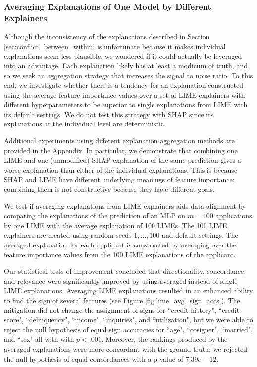 \documentclass[mnsc,blindrev]{informs3}
\begin{document}
            \subsubsection{Averaging Explanations of One Model by Different Explainers}
            \label{sec:averaging_one_explainer}
            Although the inconsistency of the explanations described in Section \ref{sec:conflict_between_within} is unfortunate because it makes individual explanations seem less plausible, we wondered if it could actually be leveraged into an advantage. Each explanation likely has at least a modicum of truth, and so we seek an aggregation strategy that increases the signal to noise ratio. To this end, we investigate whether there is a tendency for an explanation constructed using the average feature importance values over a set of LIME explainers with different hyperparameters to be superior to single explanations from LIME with its default settings. We do not test this strategy with SHAP since its explanations at the individual level are deterministic. 
            
            Additional experiments using different explanation aggregation methods are provided in the Appendix. In particular, we demonstrate that combining one LIME and one (unmodified) SHAP explanation of the same prediction gives a worse explanation than either of the individual explanations. This is because SHAP and LIME have different underlying meanings of feature importance; combining them is not constructive because they have different goals. 
        
            We test if averaging explanations from LIME explainers aids data-alignment by comparing the explanations of the prediction of an MLP on $m=100$ applications by one LIME with the average explanation of 100 LIMEs. The 100 LIME explainers are created using random seeds $1,\ldots,100$ and default settings. The averaged explanation for each applicant is constructed by averaging over the feature importance values from the 100 LIME explanations of the applicant.  %

            Our statistical tests of improvement concluded that directionality, concordance, and relevance were significantly improved by using averaged instead of single LIME explanations. Averaging LIME explanations resulted in an enhanced ability to find the sign of several features (see Figure \ref{fig:lime_avg_sign_accs}). The mitigation did not change the assignment of signs for ``credit history", ``credit score", ``delinquency", ``income", ``inquiries", and ``utilization", but we were able to reject the null hypothesis of equal sign accuracies for ``age", ``cosigner", ``married", and ``sex" all with with $p<.001$. %
            Moreover, the rankings produced by the averaged explanations were more concordant with the ground truth; we rejected the null hypothesis of equal concordances with a p-value of $7.39e-12$. %
\end{document}
